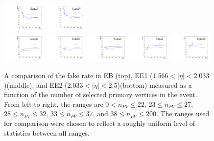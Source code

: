 \begin{figure}[!htbp]
\includegraphics[width=0.19\textwidth]{fig/compare_pv_EE1_2018_33to37.pdf}
\includegraphics[width=0.19\textwidth]{fig/compare_pv_EE1_2018_38to200.pdf}\\
\includegraphics[width=0.19\textwidth]{fig/compare_pv_EE2_2018_0to22.pdf}
\includegraphics[width=0.19\textwidth]{fig/compare_pv_EE2_2018_23to27.pdf}
\includegraphics[width=0.19\textwidth]{fig/compare_pv_EE2_2018_28to32.pdf}
\includegraphics[width=0.19\textwidth]{fig/compare_pv_EE2_2018_33to37.pdf}
\includegraphics[width=0.19\textwidth]{fig/compare_pv_EE2_2018_38to200.pdf}
\caption{A comparison of the fake rate in EB (top), EE1 ($1.566 < |\eta| < 2.033$)(middle), and EE2 ($2.033 < \lvert \eta \rvert< 2.5$)(bottom) measured as a function of the number of selected primary vertices in the event. From left to right, the ranges are $0 < n_{PV} \leq 22$, $23 \leq n_{PV} \leq 27$, $28 \leq n_{PV} \leq 32$,  $33 \leq n_{PV} \leq 37$, and  $38 \leq n_{PV} \leq 200$. The ranges used for comparison were chosen to reflect a roughly uniform level of statistics between all ranges.}
\label{fig:frpileup_compare_dataset_2018}
\end{figure}


